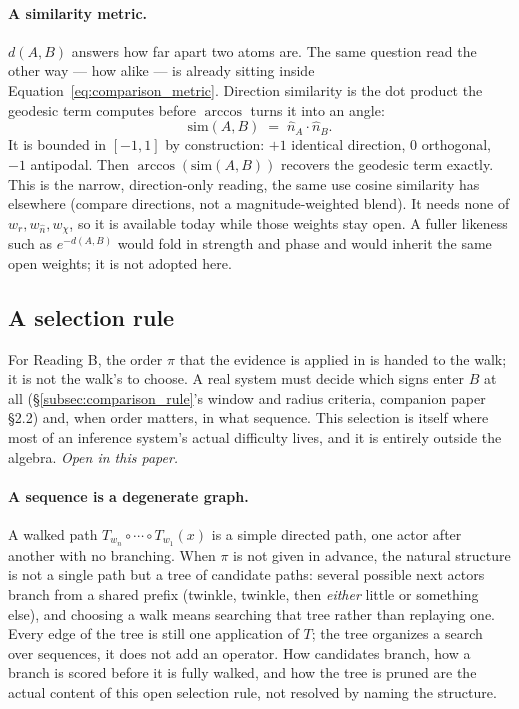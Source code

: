 \documentclass[12pt, a4paper]{article}
\begin{document}
\paragraph{A similarity metric.}
$d(A,B)$ answers how far apart two atoms are. The same question
read the other way --- how alike --- is already sitting inside
Equation~\eqref{eq:comparison_metric}. Direction similarity is the
dot product the geodesic term computes before $\arccos$ turns it
into an angle:
\begin{equation}
    \mathrm{sim}(A,B) \;=\; \hat n_A\cdot\hat n_B.
    \label{eq:direction_similarity}
\end{equation}
It is bounded in $[-1,1]$ by construction: $+1$ identical
direction, $0$ orthogonal, $-1$ antipodal. Then
$\arccos(\mathrm{sim}(A,B))$ recovers the geodesic term exactly.
This is the narrow, direction-only reading, the same use cosine
similarity has elsewhere (compare directions, not a
magnitude-weighted blend). It needs none of
$w_r,w_{\hat n},w_\chi$, so it is available today while those
weights stay open. A fuller likeness such as $e^{-d(A,B)}$ would
fold in strength and phase and would inherit the same open
weights; it is not adopted here.

\subsection{A selection rule}
\label{subsec:selection_rule}
For Reading B, the order $\pi$ that the evidence is applied in is
handed to the walk; it is not the walk's to choose. A real system must
decide which signs enter $B$ at all (\S\ref{subsec:comparison_rule}'s
window and radius criteria, companion paper \S2.2) and, when order
matters, in what sequence. This selection is itself where most of an
inference system's actual difficulty lives, and it is entirely outside
the algebra. \emph{Open in this paper.}

\paragraph{A sequence is a degenerate graph.} A walked path
$T_{w_n}\circ\cdots\circ T_{w_1}(x)$ is a simple directed path, one
actor after another with no branching. When $\pi$ is not given in
advance, the natural structure is not a single path but a tree of
candidate paths: several possible next actors branch from a shared
prefix (twinkle, twinkle, then \emph{either} little or something
else), and choosing a walk means searching that tree rather than
replaying one. Every edge of the tree is still one application of
$T$; the tree organizes a search over sequences, it does not add an
operator. How candidates branch, how a branch is scored before it is
fully walked, and how the tree is pruned are the actual content of
this open selection rule, not resolved by naming the structure.
\end{document}
